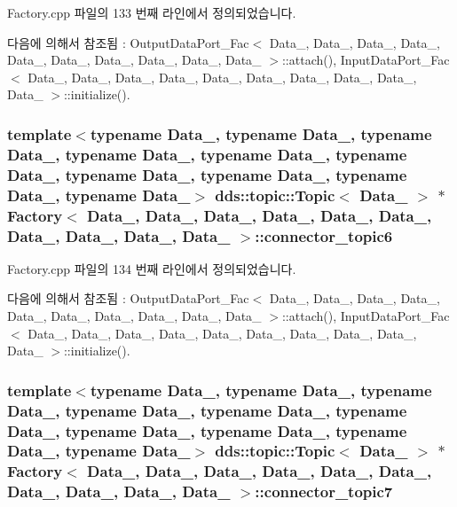 Factory.\+cpp 파일의 133 번째 라인에서 정의되었습니다.



다음에 의해서 참조됨 \+:  Output\+Data\+Port\+\_\+\+Fac$<$ Data\+\_, Data\+\_, Data\+\_, Data\+\_, Data\+\_, Data\+\_, Data\+\_, Data\+\_, Data\+\_, Data\+\_ $>$\+::attach(), Input\+Data\+Port\+\_\+\+Fac$<$ Data\+\_, Data\+\_, Data\+\_, Data\+\_, Data\+\_, Data\+\_, Data\+\_, Data\+\_, Data\+\_, Data\+\_ $>$\+::initialize().

\subsubsection[{\texorpdfstring{connector\+\_\+topic6}{connector_topic6}}]{\setlength{\rightskip}{0pt plus 5cm}template$<$typename Data\+\_, typename Data\+\_, typename Data\+\_, typename Data\+\_, typename Data\+\_, typename Data\+\_, typename Data\+\_, typename Data\+\_, typename Data\+\_, typename Data\+\_$>$ dds\+::topic\+::\+Topic$<$ Data\+\_ $>$ $\ast$ {\bf Factory}$<$ Data\+\_, Data\+\_, Data\+\_, Data\+\_, Data\+\_, Data\+\_, Data\+\_, Data\+\_, Data\+\_, Data\+\_ $>$\+::connector\+\_\+topic6}\hypertarget{classFactory_a92c01f1de5c207d812509de1ca687bea}{}\label{classFactory_a92c01f1de5c207d812509de1ca687bea}


Factory.\+cpp 파일의 134 번째 라인에서 정의되었습니다.



다음에 의해서 참조됨 \+:  Output\+Data\+Port\+\_\+\+Fac$<$ Data\+\_, Data\+\_, Data\+\_, Data\+\_, Data\+\_, Data\+\_, Data\+\_, Data\+\_, Data\+\_, Data\+\_ $>$\+::attach(), Input\+Data\+Port\+\_\+\+Fac$<$ Data\+\_, Data\+\_, Data\+\_, Data\+\_, Data\+\_, Data\+\_, Data\+\_, Data\+\_, Data\+\_, Data\+\_ $>$\+::initialize().

\subsubsection[{\texorpdfstring{connector\+\_\+topic7}{connector_topic7}}]{\setlength{\rightskip}{0pt plus 5cm}template$<$typename Data\+\_, typename Data\+\_, typename Data\+\_, typename Data\+\_, typename Data\+\_, typename Data\+\_, typename Data\+\_, typename Data\+\_, typename Data\+\_, typename Data\+\_$>$ dds\+::topic\+::\+Topic$<$ Data\+\_ $>$ $\ast$ {\bf Factory}$<$ Data\+\_, Data\+\_, Data\+\_, Data\+\_, Data\+\_, Data\+\_, Data\+\_, Data\+\_, Data\+\_, Data\+\_ $>$\+::connector\+\_\+topic7}\hypertarget{classFactory_a40529b00720b7f40615b07d0fb2265b3}{}\label{classFactory_a40529b00720b7f40615b07d0fb2265b3}


